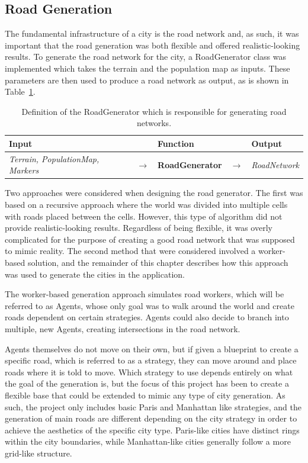 \subsection{Road Generation}
The fundamental infrastructure of a city is the road network and, as such, it was important that the road generation was both flexible and offered realistic-looking results.
To generate the road network for the city, a RoadGenerator class was implemented which takes the terrain and the population map as inputs.
These parameters are then used to produce a road network as output, as is shown in Table~\ref{table:def_roadgen}.

\begin{table}[H]
  \centering
  \begin{tabular}{lllll}
    \textbf{Input} & & \textbf{Function} & & \textbf{Output} \\
    \midrule
    \textit{Terrain, PopulationMap, Markers} & $\rightarrow$ & \textbf{RoadGenerator} & $\rightarrow$ & \textit{RoadNetwork} \\
    \bottomrule
  \end{tabular}

  \caption{Definition of the RoadGenerator which is responsible for generating road networks.}
  \label{table:def_roadgen}
\end{table}
\vspace{-0.4cm}

Two approaches were considered when designing the road generator.
The first was based on a recursive approach where the world was divided into multiple cells with roads placed between the cells.
However, this type of algorithm did not provide realistic-looking results. Regardless of being flexible, it was overly complicated for the purpose of creating a good road network that was supposed to mimic reality.
The second method that were considered involved a worker-based solution, and the remainder of this chapter describes how this approach was used to generate the cities in the application.

The worker-based generation approach simulates road workers, which will be referred to as Agents, whose only goal was to walk around the world and create roads dependent on certain strategies.
Agents could also decide to branch into multiple, new Agents, creating intersections in the road network.

Agents themselves do not move on their own, but if given a blueprint to create a specific road, which is referred to as a strategy, they can move around and place roads where it is told to move.
Which strategy to use depends entirely on what the goal of the generation is, but the focus of this project has been to create a flexible base that could be extended to mimic any type of city generation.
As such, the project only includes basic Paris and Manhattan like strategies, and the generation of main roads are different depending on the city strategy in order to achieve the aesthetics of the specific city type.
Paris-like cities have distinct rings within the city boundaries, while Manhattan-like cities generally follow a more grid-like structure.

